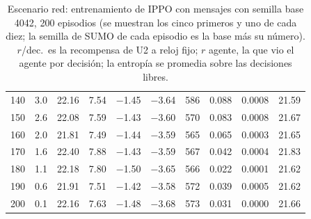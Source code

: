 \begin{table}[H]
\begin{tabular}{rrrrrrrrrr}
140 & 3.0 & 22.16 & 7.54 & $-$1.45 & $-$3.64 & 586 & 0.088 & 0.0008 & 21.59 \\
150 & 2.6 & 22.08 & 7.59 & $-$1.43 & $-$3.60 & 570 & 0.083 & 0.0008 & 21.67 \\
160 & 2.0 & 21.81 & 7.49 & $-$1.44 & $-$3.59 & 565 & 0.065 & 0.0003 & 21.65 \\
170 & 1.6 & 22.40 & 7.88 & $-$1.43 & $-$3.59 & 567 & 0.042 & 0.0004 & 21.83 \\
180 & 1.1 & 22.18 & 7.80 & $-$1.50 & $-$3.65 & 566 & 0.022 & 0.0001 & 21.62 \\
190 & 0.6 & 21.91 & 7.51 & $-$1.42 & $-$3.58 & 572 & 0.039 & 0.0005 & 21.62 \\
200 & 0.1 & 22.16 & 7.63 & $-$1.48 & $-$3.68 & 573 & 0.031 & 0.0000 & 21.66 \\
\bottomrule
\end{tabular}
\caption[Escenario red: entrenamiento de IPPO con mensajes, semilla base 4042]{Escenario red: entrenamiento de IPPO con mensajes con semilla base 4042, 200 episodios (se muestran los cinco primeros y uno de cada diez; la semilla de SUMO de cada episodio es la base más su número). $r$/dec.\ es la recompensa de U2 a reloj fijo; $r$ agente, la que vio el agente por decisión; la entropía se promedia sobre las decisiones libres.}
\label{tab:red-ippo-vecinos-4042}
\end{table}

